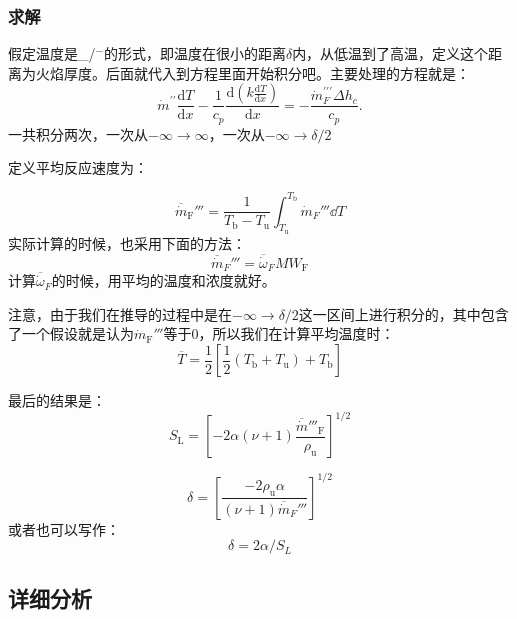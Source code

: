 \subsubsection{求解}
假定温度是\_/\(^-\)的形式，即温度在很小的距离\(\delta\)内，从低温到了高温，定义这个距离为火焰厚度。后面就代入到方程里面开始积分吧。主要处理的方程就是：
\begin{equation}
    {\dot{m}}^{\prime\prime}{\frac{\mathrm{d}T}{\mathrm{d}x}}-{\frac{1}{c_{p}}}{\frac{\mathrm{d}\left(k{\frac{\mathrm{d}T}{\mathrm{d}x}}\right)}{\mathrm{d}x}}=-{\frac{{\dot{m}}_{F}^{\prime\prime\prime}\Delta h_{c}}{c_{p}}}.
\end{equation}
一共积分两次，一次从\(-\infty\to\infty\)，一次从\(-\infty\to\delta/2\)

定义平均反应速度为：

\begin{equation}
    \overline{\dot{m}}_\mathrm{F}''' = \frac{1}{T_\mathrm{b} - T_\mathrm{u}}\int_{T_\mathrm{u}}^{T_\mathrm{b}}\dot{m}_F'''\dd T
\end{equation}
实际计算的时候，也采用下面的方法：
\begin{equation}
    \overline{\dot{m}}_F''' = \overline{\dot{\omega}}_F MW_\mathrm{F}
\end{equation}
计算\(\overline{\dot{\omega}}_F\)的时候，用平均的温度和浓度就好。

注意，由于我们在推导的过程中是在\(-\infty\to \delta/2\)这一区间上进行积分的，其中包含了一个假设就是认为\(\dot{m}_\mathrm{F}'''\)等于0，所以我们在计算平均温度时：
\begin{equation}
    \overline{T} = \frac{1}{2}\left[\frac{1}{2}(T_\mathrm{b} + T_\mathrm{u})+T_\mathrm{b}\right]
\end{equation}

最后的结果是：
\begin{equation}
    S_\mathrm{L} = \left[-2\alpha (\nu+1)\frac{\overline{\dot{m}}'''_\mathrm{F}}{\rho_\mathrm{u}}\right]^{1/2}
\end{equation}

\begin{equation}
    \delta = \left[\frac{-2\rho_\mathrm{u}\alpha}{(\nu+1)\overline{\dot{m}}_F'''}\right]^{1/2}
\end{equation}
或者也可以写作：
\begin{equation}
    \delta = 2\alpha/S_L
\end{equation}

\subsection{详细分析}
